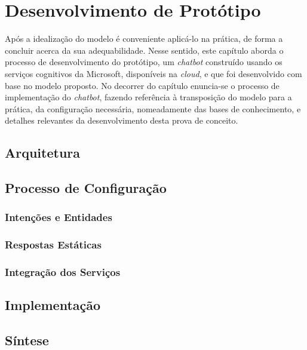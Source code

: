 \chapter{Desenvolvimento de Protótipo}
\label{chap:Chapter5}
Após a idealização do modelo é conveniente aplicá-lo na prática, de forma a concluir acerca da sua adequabilidade. Nesse sentido, este capítulo aborda o processo de desenvolvimento do protótipo, um \textit{chatbot} construído usando os serviços cognitivos da Microsoft, disponíveis na \textit{cloud}, e que foi desenvolvido com base no modelo proposto. No decorrer do capítulo enuncia-se o processo de implementação do \textit{chatbot}, fazendo referência à transposição do modelo para a prática, da configuração necessária, nomeadamente das bases de conhecimento, e detalhes relevantes da desenvolvimento desta prova de conceito.

\section{Arquitetura}
\label{sec:chap05_architecture}
\tbd

\section{Processo de Configuração}
\label{sec:chap05_configprocess}
\tbd

\subsection{Intenções e Entidades}
\tbd

\subsection{Respostas Estáticas}
\tbd

\subsection{Integração dos Serviços}
\tbd

\section{Implementação}
\label{sec:chap05_prototypeimplementation}
\tbd

\section{Síntese}
\label{sec:chap05_chaptersummary}
\tbd
